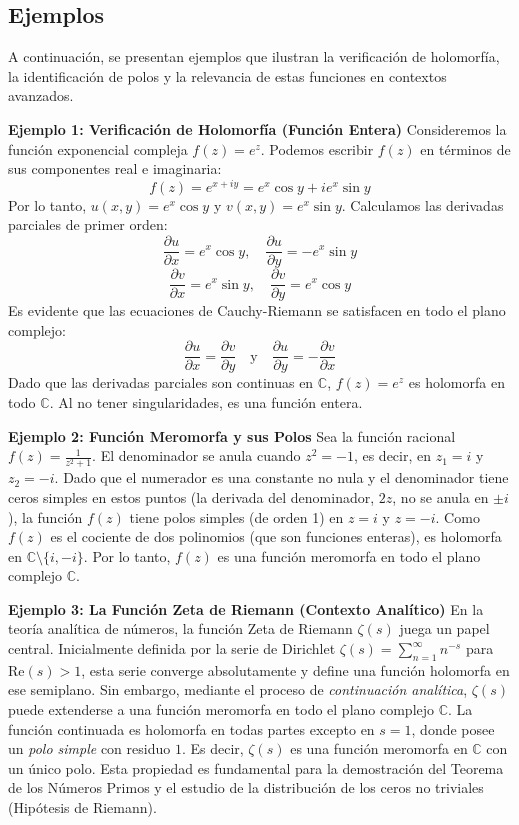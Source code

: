 \documentclass[a4paper]{article}
\begin{document}
\subsection{Ejemplos}

A continuación, se presentan ejemplos que ilustran la verificación de holomorfía, la identificación de polos y la relevancia de estas funciones en contextos avanzados.

\textbf{Ejemplo 1: Verificación de Holomorfía (Función Entera)}
Consideremos la función exponencial compleja $f(z) = e^z$. Podemos escribir $f(z)$ en términos de sus componentes real e imaginaria:
$$ f(z) = e^{x+iy} = e^x \cos y + i e^x \sin y $$
Por lo tanto, $u(x, y) = e^x \cos y$ y $v(x, y) = e^x \sin y$. Calculamos las derivadas parciales de primer orden:
$$ \frac{\partial u}{\partial x} = e^x \cos y, \quad \frac{\partial u}{\partial y} = -e^x \sin y $$
$$ \frac{\partial v}{\partial x} = e^x \sin y, \quad \frac{\partial v}{\partial y} = e^x \cos y $$
Es evidente que las ecuaciones de Cauchy-Riemann se satisfacen en todo el plano complejo:
$$ \frac{\partial u}{\partial x} = \frac{\partial v}{\partial y} \quad \text{y} \quad \frac{\partial u}{\partial y} = -\frac{\partial v}{\partial x} $$
Dado que las derivadas parciales son continuas en $\mathbb{C}$, $f(z) = e^z$ es holomorfa en todo $\mathbb{C}$. Al no tener singularidades, es una función entera.

\textbf{Ejemplo 2: Función Meromorfa y sus Polos}
Sea la función racional $f(z) = \frac{1}{z^2 + 1}$. El denominador se anula cuando $z^2 = -1$, es decir, en $z_1 = i$ y $z_2 = -i$. 
Dado que el numerador es una constante no nula y el denominador tiene ceros simples en estos puntos (la derivada del denominador, $2z$, no se anula en $\pm i$), la función $f(z)$ tiene polos simples (de orden 1) en $z = i$ y $z = -i$. 
Como $f(z)$ es el cociente de dos polinomios (que son funciones enteras), es holomorfa en $\mathbb{C} \setminus \{i, -i\}$. Por lo tanto, $f(z)$ es una función meromorfa en todo el plano complejo $\mathbb{C}$.

\textbf{Ejemplo 3: La Función Zeta de Riemann (Contexto Analítico)}
En la teoría analítica de números, la función Zeta de Riemann $\zeta(s)$ juega un papel central. Inicialmente definida por la serie de Dirichlet $\zeta(s) = \sum_{n=1}^{\infty} n^{-s}$ para $\text{Re}(s) > 1$, esta serie converge absolutamente y define una función holomorfa en ese semiplano.
Sin embargo, mediante el proceso de \textit{continuación analítica}, $\zeta(s)$ puede extenderse a una función meromorfa en todo el plano complejo $\mathbb{C}$. La función continuada es holomorfa en todas partes excepto en $s = 1$, donde posee un \textit{polo simple} con residuo $1$. Es decir, $\zeta(s)$ es una función meromorfa en $\mathbb{C}$ con un único polo. Esta propiedad es fundamental para la demostración del Teorema de los Números Primos y el estudio de la distribución de los ceros no triviales (Hipótesis de Riemann).
\end{document}
